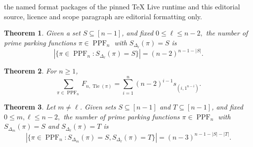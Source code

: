 \documentclass[10pt,a4paper]{amsart}
\newtheorem{theorem}{Theorem}[section]
\theoremstyle{definition}
\theoremstyle{remark}
\newcommand{\SetL}[1]{S_{\Delta_{#1}}}
\DeclareMathOperator{\PPF}{PPF}
\DeclareMathOperator{\Tie}{Tie}
\begin{document}
the named format packages of the pinned TeX Live runtime and this editorial source, licence and scope paragraph are editorial formatting only.\par\smallskip
\setcounter{section}{6}
\setcounter{equation}{0}
\setcounter{definition}{6}
\setcounter{example}{7}
\setcounter{notation}{2}
\setcounter{problem}{0}
\setcounter{question}{0}
\setcounter{remark}{6}
\setcounter{theorem}{0}
\begin{theorem}\label{thm:Tie_Set_count}
    Given a set $S\subseteq[n-1]$, and fixed $0\leq \ell\leq n-2,$ the number of prime parking functions $\pi\in\PPF_n$ with $\SetL{\ell}(\pi)=S$ is  
    $$|\{\pi \in \PPF_n : \SetL{\ell}(\pi)=S\}| =(n-2)^{n-1-|S|}.$$
\end{theorem}

\setcounter{section}{6}
\setcounter{equation}{0}
\setcounter{definition}{6}
\setcounter{example}{7}
\setcounter{notation}{2}
\setcounter{problem}{0}
\setcounter{question}{0}
\setcounter{remark}{6}
\setcounter{theorem}{1}
\begin{theorem}\label{thm:quasisym}
For $n\geq 1$,
\begin{equation*}
\sum_{\pi\in\PPF_n}F_{n,\Tie(\pi)} =\sum_{i=1}^n (n-2)^{i-1}s_{(i,1^{n-i})}.
\end{equation*}
\end{theorem}

\setcounter{section}{6}
\setcounter{equation}{10}
\setcounter{definition}{6}
\setcounter{example}{8}
\setcounter{notation}{2}
\setcounter{problem}{0}
\setcounter{question}{0}
\setcounter{remark}{6}
\setcounter{theorem}{3}
\begin{theorem}\label{thm:Tie_Set_count_mixed}
    Let $m \neq \ell$. Given sets $S\subseteq[n-1]$ and $T\subseteq[n-1]$, and fixed $0\leq m, \ell\leq n-2,$ the number of prime parking functions $\pi\in\PPF_n$ with $\SetL{m}(\pi)=S$ and $\SetL{\ell}(\pi)=T$ is  
    $$|\{\pi \in \PPF_n : \SetL{m}(\pi)=S, \SetL{\ell}(\pi)=T\}| =(n-3)^{n-1-|S|-|T|}.$$
\end{theorem}
\end{document}
